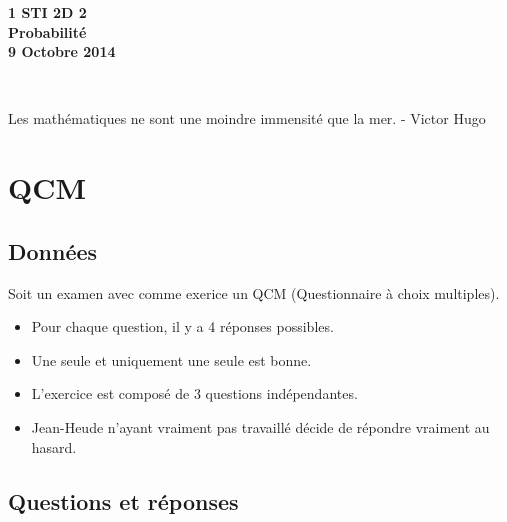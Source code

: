 \documentclass[11pt]{article}
\begin{document}

\begin{minipage}[t]{\textwidth}
  \raggedright
      {\bfseries 1 STI 2D 2}\\[.35ex]
      \vspace*{-1cm}
      \raggedleft
          {\bfseries Probabilité}\\[.35ex]
          {\bfseries 9 Octobre 2014}\\[.35ex]
\end{minipage}\\[1em]

\begin{center}
  \textsf{Les mathématiques ne sont une moindre immensité que la mer. - Victor Hugo}
\end{center}

\setlength{\columnseprule}{1pt}
\section*{QCM}
\subsection*{Données}

Soit un examen avec comme exerice un QCM (Questionnaire à choix multiples).
\begin{itemize}
\item Pour chaque question, il y a 4 réponses possibles. 
\item Une seule et uniquement une seule est bonne. 
\item L'exercice est composé de 3 questions indépendantes.
\item Jean-Heude n'ayant vraiment pas travaillé décide de répondre vraiment au hasard.
\end{itemize}

\subsection*{Questions et réponses}
\end{document}

